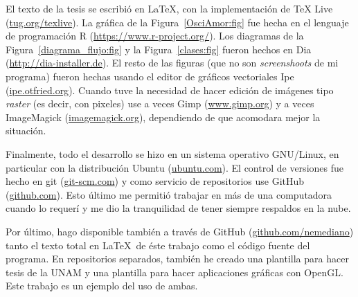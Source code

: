 El texto de la tesis se escribió en \LaTeX, con la implementación de TeX Live (\href{https://tug.org/texlive/}{tug.org/texlive}).
La gráfica de la Figura~\ref{OsciAmor:fig} fue hecha en el lenguaje de programación R (\href{https://www.r-project.org/}{https://www.r-project.org/}).
Los diagramas de la Figura~\ref{diagrama_flujo:fig} y la Figura~\ref{clases:fig} fueron hechos en Dia (\href{http://dia-installer.de/index.html.en}{http://dia-installer.de}).
El resto de las figuras (que no son \emph{\textenglish{screenshoots}} de mi programa) fueron hechas usando el editor de gráficos vectoriales Ipe (\href{https://ipe.otfried.org/}{ipe.otfried.org}).
Cuando tuve la necesidad de hacer edición de imágenes tipo \emph{\textenglish{raster}} (es decir, con pixeles) use a veces Gimp (\href{https://www.gimp.org/}{www.gimp.org}) y a veces ImageMagick (\href{https://imagemagick.org/index.php}{imagemagick.org}), dependiendo de que acomodara mejor la situación.

Finalmente, todo el desarrollo se hizo en un sistema operativo GNU/Linux, en particular con la distribución Ubuntu (\href{https://ubuntu.com/}{ubuntu.com}).
El control de versiones fue hecho en git (\href{https://git-scm.com/}{git-scm.com}) y como servicio de repositorios use GitHub (\href{https://github.com/}{github.com}).
Esto último me permitió trabajar en más de una computadora cuando lo requerí y me dio la tranquilidad de tener siempre respaldos en la nube.

Por último, hago disponible también a través de GitHub (\href{https://github.com/nemediano}{github.com/nemediano}) tanto el texto total en \LaTeX~de éste trabajo como el código fuente del programa.
En repositorios separados, también he creado una plantilla para hacer tesis de la UNAM y una plantilla para hacer aplicaciones gráficas con OpenGL.
Este trabajo es un ejemplo del uso de ambas.

